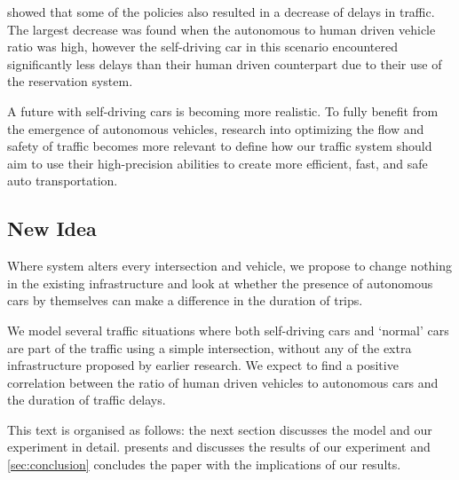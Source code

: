 \textcite{dresner2007sharing} showed that some of the policies also resulted in a decrease of delays in traffic. The largest decrease was found when the autonomous to human driven vehicle ratio was high, however the self-driving car in this scenario encountered significantly less delays than their human driven counterpart due to their use of the reservation system.

A future with self-driving cars is becoming more realistic. To fully benefit from the emergence of autonomous vehicles, research into optimizing the flow and safety of traffic becomes more relevant to define how our traffic system should aim to use their high-precision abilities to create more efficient, fast, and safe auto transportation.


\subsection{New Idea}
\label{sub:intro:new_idea}	
Where \textcite{dresner2007sharing} system alters every intersection and vehicle, we propose to change nothing in the existing infrastructure and look at whether the presence of autonomous cars by themselves can make a difference in the duration of trips. 

We model several traffic situations where both self-driving cars and `normal' cars are part of the traffic using a simple intersection, without any of the extra infrastructure proposed by earlier research. We expect to find a positive correlation between the ratio of human driven vehicles to autonomous cars and the duration of traffic delays.

This text is organised as follows: the next section discusses the model and our experiment in detail.  presents and discusses the results of our experiment and \cref{sec:conclusion} concludes the paper with the implications of our results.